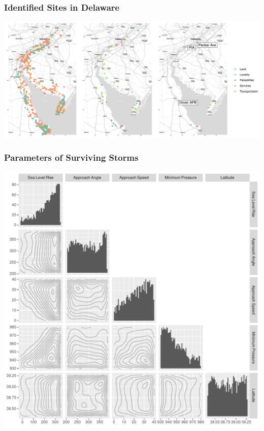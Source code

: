 \documentclass[aspectratio=169,10pt,notes]{beamer}
\newlength{\frametextheight}
\begin{document}
\note{
    \begin{itemize}
        \item
    \end{itemize}
}

\begin{frame}
    \frametitle{Identified Sites in Delaware}
    \begin{centering}
        \includegraphics[width=0.99\linewidth]{./ch3/plots/delaware}
    \end{centering}
\end{frame} %

\note{
    \begin{itemize}
        \item
    \end{itemize}
}

\begin{frame}
    \frametitle{Parameters of Surviving Storms}
    \begin{center}
        \includegraphics[height=0.99\frametextheight]{./ch3/plots/threshold_pairs}
    \end{center}
\end{frame} %
\end{document}
